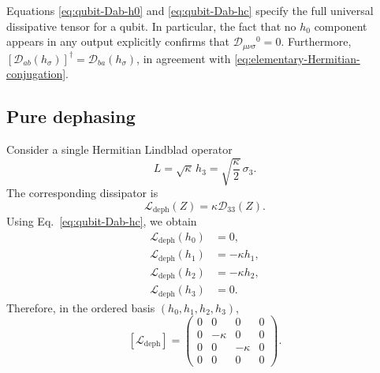 \documentclass[notitlepage,aip,reprint,onecolumn]{revtex4-1}
\theoremstyle{definition}
\begin{document}
Equations \eqref{eq:qubit-Dab-h0} and \eqref{eq:qubit-Dab-hc} specify the full universal dissipative tensor for a qubit. In particular, the fact that no \(h_0\) component appears in any output explicitly confirms that \(\mathcal D_{\mu\nu\sigma}{}^0 = 0\). Furthermore,
\(
\left[
\mathcal D_{ab}(h_\sigma)
\right]^\dagger
=
\mathcal D_{ba}(h_\sigma)
\), in agreement with  \eqref{eq:elementary-Hermitian-conjugation}.

\subsection{Pure dephasing}

Consider a single Hermitian Lindblad operator
\begin{equation}\label{eq:qubit-dephasing-L}
    L
    =
    \sqrt{\kappa}\,h_3
    =
    \sqrt{\frac{\kappa}{2}}\,\sigma_3.
\end{equation}
The corresponding dissipator is
\[
    \mathcal L_{\mathrm{deph}}(Z)
    =
    \kappa\mathcal D_{33}(Z).
\]
Using Eq.~\eqref{eq:qubit-Dab-hc}, we obtain
\begin{subequations}\label{eq:dephasing-basis-action}
\begin{align}
    \mathcal L_{\mathrm{deph}}(h_0)
    &=
    0,
    \\
    \mathcal L_{\mathrm{deph}}(h_1)
    &=
    -\kappa h_1,
    \\
    \mathcal L_{\mathrm{deph}}(h_2)
    &=
    -\kappa h_2,
    \\
    \mathcal L_{\mathrm{deph}}(h_3)
    &=
    0.
\end{align}
\end{subequations}
Therefore, in the ordered basis
\((h_0,h_1,h_2,h_3)\),
\begin{equation}\label{eq:dephasing-matrix}
    \left[
    \mathcal L_{\mathrm{deph}}
    \right]
    =
    \begin{pmatrix}
    0 & 0       & 0       & 0\\
    0 & -\kappa & 0       & 0\\
    0 & 0       & -\kappa & 0\\
    0 & 0       & 0       & 0
    \end{pmatrix}.
\end{equation}
\end{document}
